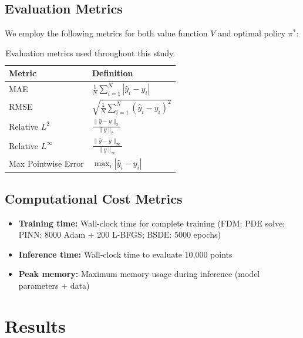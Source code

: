 \documentclass[12pt,a4paper]{article}
\begin{document}
\subsection{Evaluation Metrics}

We employ the following metrics for both value function $V$ and optimal policy $\pi^*$:

\begin{table}[H]
\centering
\caption{Evaluation metrics used throughout this study.}
\label{tab:metrics}
\begin{tabular}{ll}
\toprule
\textbf{Metric} & \textbf{Definition} \\
\midrule
MAE & $\displaystyle \frac{1}{N} \sum_{i=1}^N |\hat{y}_i - y_i|$ \\
RMSE & $\displaystyle \sqrt{\frac{1}{N} \sum_{i=1}^N (\hat{y}_i - y_i)^2}$ \\
Relative $L^2$ & $\displaystyle \frac{\|\hat{y} - y\|_2}{\|y\|_2}$ \\
Relative $L^\infty$ & $\displaystyle \frac{\|\hat{y} - y\|_\infty}{\|y\|_\infty}$ \\
Max Pointwise Error & $\displaystyle \max_i |\hat{y}_i - y_i|$ \\
\bottomrule
\end{tabular}
\end{table}

\subsection{Computational Cost Metrics}

\begin{itemize}
    \item \textbf{Training time:} Wall-clock time for complete training (FDM: PDE solve; PINN: 8000 Adam + 200 L-BFGS; BSDE: 5000 epochs)
    \item \textbf{Inference time:} Wall-clock time to evaluate 10,000 points
    \item \textbf{Peak memory:} Maximum memory usage during inference (model parameters + data)
\end{itemize}

\section{Results}
\label{sec:results}
\end{document}
